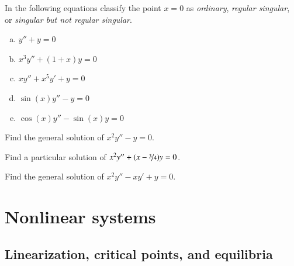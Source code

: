 \documentclass[12pt]{book}
\begin{document}
\setcounter{exercise}{100}

\begin{exercise}
In the following equations
classify the point $x=0$ as \emph{ordinary}, \emph{regular singular}, or
\emph{singular but not regular singular}.
\begin{enumerate}[a)]
\item $y''+y=0$
\item $x^3y''+(1+x)y=0$
\item $xy''+x^5y'+y=0$
\item $\sin(x)y''-y=0$
\item $\cos(x)y''-\sin(x)y=0$
\end{enumerate}
\end{exercise}

\begin{exercise}
Find the general solution of $x^2 y'' -y = 0$.
\end{exercise}

\begin{exercise}
Find a particular solution of $x^2 y'' +(x-\nicefrac{3}{4})y = 0$.
\end{exercise}

\begin{exercise}[tricky]
Find the general solution of $x^2 y'' - x y' +y = 0$.
\end{exercise}


\chapter{Nonlinear systems} \label{nlin:chapter}


\section{Linearization, critical points, and equilibria}
\end{document}
